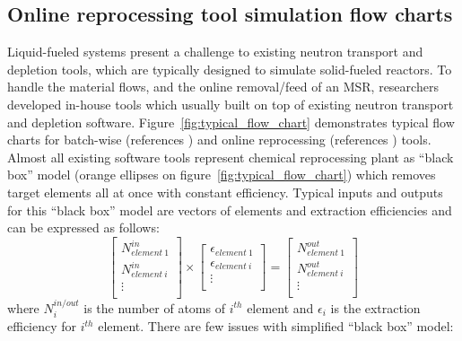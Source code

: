 \subsection{Online reprocessing tool simulation flow charts}
Liquid-fueled systems present a challenge to existing neutron transport 
and depletion tools, which are typically designed to simulate 
solid-fueled reactors. To handle the material flows, and the online 
removal/feed of an \gls{MSR}, researchers developed in-house 
tools which usually built on top of existing neutron transport and 
depletion software. Figure~\ref{fig:typical_flow_chart} demonstrates typical 
flow charts for batch-wise (references \cite{betzler_molten_2017,
li_optimization_2018,rykhlevskii_modeling_2019,zhou_fuel_2018-1,
sheu_depletion_2013,park_whole_2015}) and 
online reprocessing (references \cite{heuer_simulation_2010,
doligez_coupled_2014,  heuer_towards_2014, fiorina_investigation_2013,
nuttin_potential_2005, aufiero_extended_2013,
de_troullioud_de_lanversin_toward_2017}) tools. Almost all existing 
software tools represent chemical reprocessing plant as ``black box'' 
model (orange ellipses on figure~\ref{fig:typical_flow_chart}) which 
removes target 
elements all at once with constant efficiency. Typical inputs and outputs 
for this ``black box'' model are vectors of elements and extraction 
efficiencies and can be 
expressed as follows:
\begin{equation}
\begin{bmatrix}
N^{in}_{element \: 1} \\ N^{in}_{element \: i} \\ \vdots \\
\end{bmatrix} 
\times
\begin{bmatrix}
\epsilon_{element \: 1} \\ \epsilon_{element \: i} \\ \vdots \\
\end{bmatrix} =
\begin{bmatrix}
N^{out}_{element \: 1} \\ N^{out}_{element \: i} \\ \vdots \\
\end{bmatrix}
\end{equation}
where $N^{in/out}_i$ is the number of atoms of $i^{th}$ element and 
$\epsilon_i$ is the 
extraction efficiency for $i^{th}$ element. There are few issues with 
simplified ``black box'' model: 
